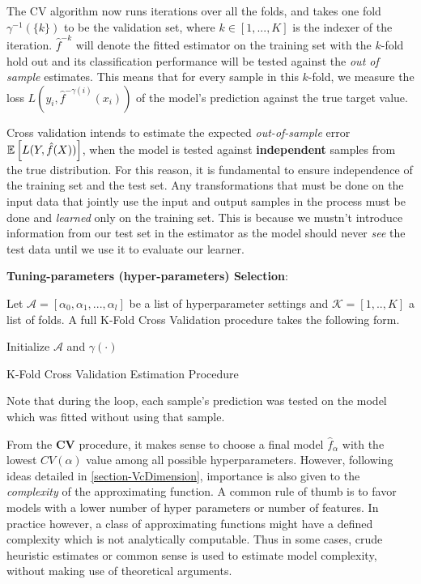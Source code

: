  The CV algorithm now runs iterations over all the folds, and takes one fold $\gamma^{-1}(\{k\})$ to be the validation set, where $k \in [1,...,K]$ is the indexer of the iteration. $\hat{f}^{-k}$ will denote the fitted estimator on the training set with the $k$-fold hold out and its classification performance will be tested against the \textit{out of sample} estimates. This means that for every sample in this $k$-fold, we measure the loss $L(y_i, \hat{f}^{-\gamma(i)}(x_i))$ of the model's prediction against the true target value.

Cross validation intends to estimate the expected \textit{out-of-sample} error $\operatorname{\mathbb{E}} \left[  L(Y, \hat{f}(X)) \right]$, when the model is tested against \textbf{independent} samples from the true distribution. For this reason, it is fundamental to ensure independence of the training set and the test set. Any transformations that must be done on the input data that jointly use the input and output samples in the process must be done and \textit{learned} only on the training set. This is because we mustn't introduce information from our test set in the estimator as the model should never \textit{see} the test data until we use it to evaluate our learner.

\textbf{Tuning-parameters (hyper-parameters) Selection}:

 Let $\mathcal{A} = [\alpha_0, \alpha_1,..., \alpha_l   ]$ be a list of hyperparameter settings and  $\mathcal{K} =[1,..,K]$ a list of folds.  A full K-Fold Cross Validation procedure takes the following form.

  \begin{algorithm}%
  \SetAlgoLined
  Initialize $\mathcal{A}$ and $\gamma(\cdot)$\;
  \caption{K-Fold Cross Validation Estimation Procedure}
 \end{algorithm}

Note that during the loop, each sample's prediction was tested on the model which was fitted without using that sample.

From the \textbf{CV} procedure, it makes sense to choose a final  model $\hat{f}_\alpha$ with the lowest $CV(\alpha)$ value among all possible hyperparameters. However, following ideas detailed in \ref{section-VcDimension}, importance is also given to the \textit{complexity} of the approximating function. A common rule of thumb is to favor models with a lower number of hyper parameters or number of features. In practice however, a class of approximating functions might have a defined complexity which is not analytically computable. Thus in some cases, crude heuristic estimates or common sense is used to estimate model complexity, without making use of theoretical arguments.

